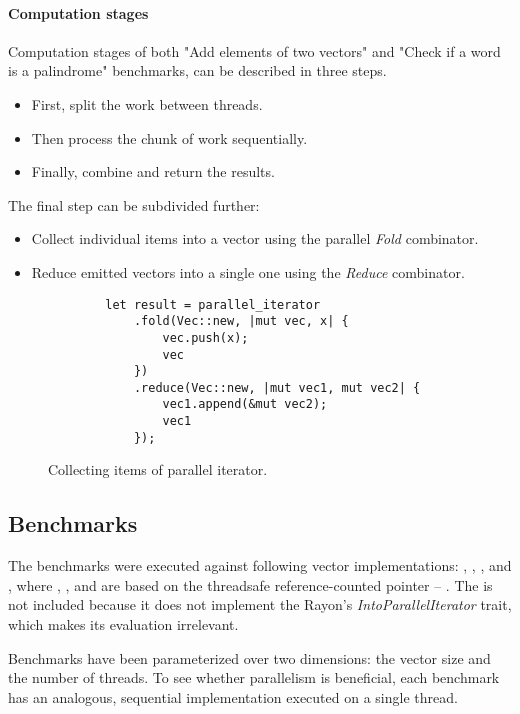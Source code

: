 \paragraph{Computation stages}
Computation stages of both "Add elements of two vectors" and "Check if a word is a palindrome" benchmarks, can be described in three steps.
\begin{itemize}
    \item First, split the work between threads.
    \item Then process the chunk of work sequentially.
    \item Finally, combine and return the results.
\end{itemize}

The final step can be subdivided further:
\begin{itemize}
    \item Collect individual items into a vector using the parallel \emph{Fold} combinator.
    \item Reduce emitted vectors into a single one using the \emph{Reduce} combinator.
\end{itemize}

\begin{figure}[!htbp]
    \centering

    \begin{verbatim}
        let result = parallel_iterator
            .fold(Vec::new, |mut vec, x| {
                vec.push(x);
                vec
            })
            .reduce(Vec::new, |mut vec1, mut vec2| {
                vec1.append(&mut vec2);
                vec1
            });
    \end{verbatim}

    \caption{Collecting items of parallel iterator.}
    \label{fig:fold-reduce}
\end{figure}

\subsection{Benchmarks}
\label{sec:par-benchmarks}
The benchmarks were executed against following vector implementations: \stdvec{}, \rbvec{}, \rrbvec{}, and \pvec{}, where \rbvec{}, \rrbvec{}, and \pvec{} are based on the threadsafe reference-counted pointer -- \arc{}. The \imrsvec{} is not included because it does not implement the Rayon's \emph{IntoParallelIterator} trait, which makes its evaluation irrelevant.

Benchmarks have been parameterized over two dimensions: the vector size and the number of threads. To see whether parallelism is beneficial, each benchmark has an analogous, sequential implementation executed on a single thread.

